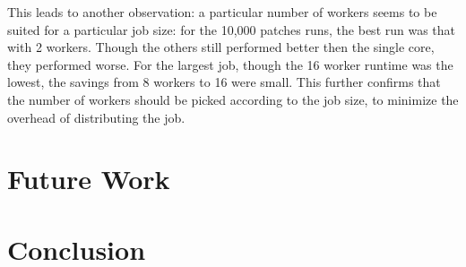 \documentclass[%
  final,
  notitlepage,
  narroweqnarray,
  inline,
]{ieee}
\begin{document}
This leads to another observation: a particular number of workers seems to be
suited for a particular job size: for the 10,000 patches runs, the best run was
that with 2 workers. Though the others still performed better then the single
core, they performed worse. For the largest job, though the 16 worker runtime
was the lowest, the savings from 8 workers to 16 were small. This further
confirms that the number of workers should be picked according to the job size,
to minimize the overhead of distributing the job.

\section{Future Work}

%

\section{Conclusion}



\end{document}
